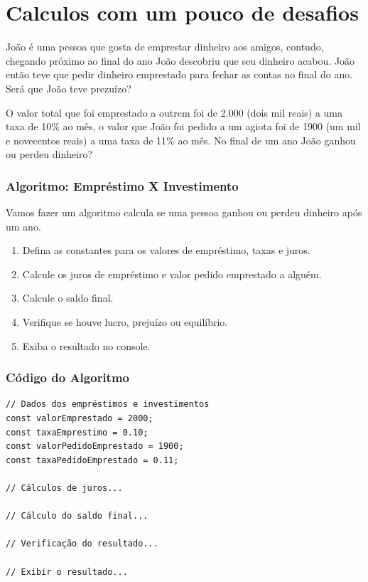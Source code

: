 \documentclass[13pt, xcolor={dvipsnames,svgnames}, portuguese]{beamer}
\begin{document}
\section{Calculos com um pouco de desafios}
\begin{frame}
João é uma pessoa que gosta de emprestar dinheiro aos amigos, contudo,
\pause 
chegando próximo ao final do ano João descobriu que seu dinheiro acabou.
\pause
João então teve que pedir dinheiro emprestado para fechar as contas no final do ano.
\pause
Será que João teve prezuízo?
\end{frame}
\begin{frame}
O valor total que foi emprestado a outrem foi de 2.000 (dois mil reais)
\pause 
a uma taxa de 10\% ao mês,
\pause
o valor que João foi pedido a um agiota foi de 1900 (um mil e novecentos reais)
\pause
a uma taxa de 11\% ao mês.
\pause
 No final de um ano João ganhou ou perdeu dinheiro?
\end{frame}
\begin{frame}
\frametitle{Algoritmo: Empréstimo X Investimento}

Vamos fazer um algoritmo calcula se uma pessoa ganhou ou perdeu dinheiro após um ano.
\vspace{0.5cm}
\begin{enumerate}
  \item Defina as constantes para os valores de empréstimo, taxas e juros.
  \item Calcule os juros de empréstimo e valor pedido emprestado a alguém.
  \item Calcule o saldo final.
  \item Verifique se houve lucro, prejuízo ou equilíbrio.
  \item Exiba o resultado no console.
\end{enumerate}

\end{frame}
\begin{frame}[fragile]
\frametitle{Código do Algoritmo}

\begin{verbatim}
// Dados dos empréstimos e investimentos
const valorEmprestado = 2000;
const taxaEmprestimo = 0.10;
const valorPedidoEmprestado = 1900;
const taxaPedidoEmprestado = 0.11;

// Cálculos de juros...

// Cálculo do saldo final...

// Verificação do resultado...

// Exibir o resultado...
\end{verbatim}

\end{frame}
\end{document}
